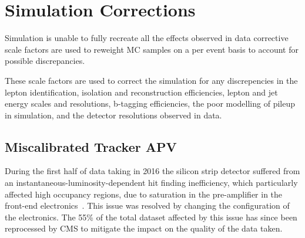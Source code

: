 %
%

\section{Simulation Corrections}\label{sec:simCorrections}
Simulation is unable to fully recreate all the effects observed in data corrective scale factors are used to reweight MC samples on a per event basis to account for possible discrepancies.

These scale factors are used to correct the simulation for any discrepencies in the lepton identification, isolation and reconstruction efficiencies, lepton and jet energy scales and resolutions, b-tagging efficiencies, the poor modelling of pileup in simulation, and the detector resolutions observed in data.

\subsection{Miscalibrated Tracker APV}\label{subsec:hipEffect}
During the first half of data taking in 2016 the silicon strip detector suffered from an instantaneous-luminosity-dependent hit finding inefficiency, which particularly affected high occupancy regions, due to saturation in the pre-amplifier in the front-end electronics~\cite{Fiori:2016ebh}.
This issue was resolved by changing the configuration of the electronics.
The 55\% of the total dataset affected by this issue has since been reprocessed by CMS to mitigate the impact on the quality of the data taken.

